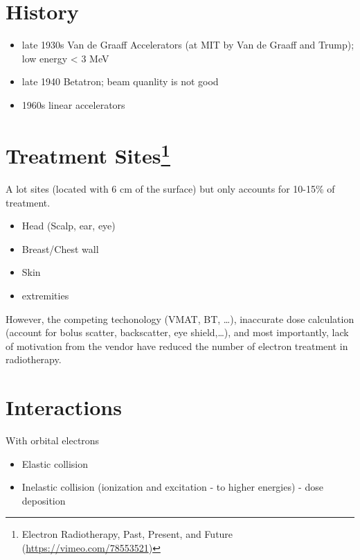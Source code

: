 \documentclass[]{book}
\providecommand{\tightlist}{%
  \setlength{\itemsep}{0pt}\setlength{\parskip}{0pt}}
\let\rmarkdownfootnote\footnote%
\def\footnote{\protect\rmarkdownfootnote}
\theoremstyle{definition}
\theoremstyle{definition}
\theoremstyle{definition}
\theoremstyle{remark}
\begin{document}
\section{History}\label{history-2}

\begin{itemize}
\tightlist
\item
  late 1930s Van de Graaff Accelerators (at MIT by Van de Graaff and
  Trump); low energy \textless{} 3 MeV
\item
  late 1940 Betatron; beam quanlity is not good
\item
  1960s linear accelerators
\end{itemize}

\section[Treatment Sites]{\texorpdfstring{Treatment Sites\footnote{Electron
  Radiotherapy, Past, Present, and Future
  (\url{https://vimeo.com/78553521})}}{Treatment Sites}}\label{treatment-sites}

A lot sites (located with 6 cm of the surface) but only accounts for
10-15\% of treatment.

\begin{itemize}
\tightlist
\item
  Head (Scalp, ear, eye)
\item
  Breast/Chest wall
\item
  Skin
\item
  extremities
\end{itemize}

However, the competing techonology (VMAT, BT, \ldots{}), inaccurate dose
calculation (account for bolus scatter, backscatter, eye
shield,\ldots{}), and most importantly, lack of motivation from the
vendor have reduced the number of electron treatment in radiotherapy.

\section{Interactions}\label{e-interactions}

With orbital electrons

\begin{itemize}
\tightlist
\item
  Elastic collision
\item
  Inelastic collision (ionization and excitation - to higher energies) -
  dose deposition
\end{itemize}
\end{document}
